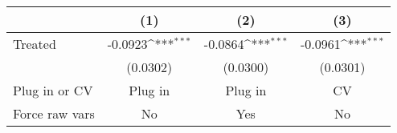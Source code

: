\def\sym#1{\ifmmode^{#1}\else\(^{#1}\)\fi}\hline\hline\begin{tabular}{l c c c} & (1) & (2) & (3) \\  \hline\hline\midrule
Treated             &     -0.0923\sym{***}&     -0.0864\sym{***}&     -0.0961\sym{***}\\
                    &    (0.0302)         &    (0.0300)         &    (0.0301)         \\
\midrule
Plug in or CV       &     Plug in         &     Plug in         &          CV         \\
Force raw vars      &          No         &         Yes         &          No         \\
\hline\hline \end{tabular} 